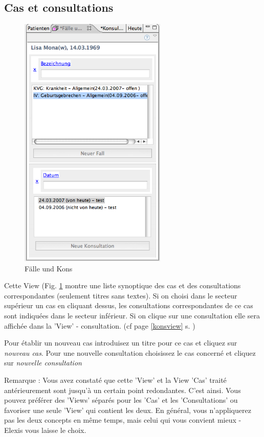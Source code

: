 \subsection{Cas et consultations}
\begin{figure}
  \includegraphics[width=7cm]{images/fallkonsview}
  \caption{Fälle und Kons}
  \label{fig:fallkons}
\end{figure}
Cette View (Fig. \ref{fig:fallkons} montre une liste synoptique des cas et des consultations correspondantes (seulement titres sans textes). Si on choisi dans le secteur supérieur un cas en cliquant dessus, les consultations correspondantes de ce cas sont indiquées dans le secteur inférieur.
Si on clique sur une consultation elle sera affichée dans la 'View' - consultation.
(cf page \ref{konsview} s. \pageref{konsview})

Pour établir un nouveau cas introduisez un titre pour ce cas et cliquez sur \textit{nouveau cas}. Pour une nouvelle consultation choisissez le cas concerné et cliquez sur  \textit{nouvelle consultation}

\medskip

Remarque : Vous avez constaté que cette 'View' et la View 'Cas' traité antérieurement sont jusqu'à un certain point redondantes. C'est ainsi. Vous pouvez préférer des 'Views' séparés pour les 'Cas' et les 'Consultations' ou favoriser une seule 'View' qui contient les deux. En général, vous n'appliquerez pas les deux concepts en même temps, mais celui qui vous convient mieux - Elexis vous laisse le choix.


